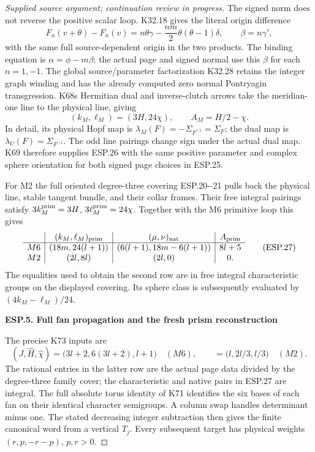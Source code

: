 \begin{proof}[Supplied source argument; continuation review in progress]
The signed norm does not reverse the positive scalar loop. K32.18
gives the literal origin difference
\[
 F_n(v+\theta)-F_n(v)
       =n\theta\gamma-\frac{nm}{2}\theta(\theta-1)\delta,
 \qquad \beta=n\gamma',
 \tag{ESP.25}
\]
with the same full source-dependent origin in the two products.
The binding equation is \(\alpha=\phi-m\beta\); the actual page
and signed normal use this \(\beta\) for each \(n=1,-1\).
The global source/parameter factorization K32.28 retains the integer
graph winding and has the already computed zero normal Pontryagin
transgression. K68\textquotesingle s Hermitian dual and inverse-clutch arrows take
the meridian-one line to the physical line, giving
\[
 (k_M,\ell_M)=(3H,24\chi),\qquad
                   A_M=H/2-\chi.
 \tag{ESP.26}
\]
In detail, its physical Hopf map is
\(\lambda_M(F)=-\Sigma_{F^{-1}}=\Sigma_F\); the dual map is
\(\lambda_U(F)=\Sigma_{F^{-1}}\). The odd line pairings change
sign under the actual dual map. K69 therefore supplies ESP.26 with
the same positive parameter and complex sphere orientation for both
signed page choices in ESP.25.

For M2 the full oriented degree-three covering ESP.20-\/-21 pulls back
the physical line, stable tangent bundle, and their collar frames.
Their free integral pairings satisfy
\(3k_M^{\rm prim}=3H\), \(3\ell_M^{\rm prim}=24\chi\).
Together with the M6 primitive loop this gives
\[
 \begin{array}{c|c|c|c}
 &(k_M,\ell_M)_{\rm prim}&(\mu,\nu)_{\rm nat}&A_{\rm prim}\\\hline
 M6&(18m,24(l+1))&(6(l+1),18m-6(l+1))&8l+5\\
 M2&(2l,8l)&(2l,0)&0.
 \end{array}
 \tag{ESP.27}
\]
The equalities used to obtain the second row are in free integral
characteristic groups on the displayed covering. Its sphere class
is subsequently evaluated by \((4k_M-\ell_M)/24\).

\par

\medskip\noindent\textbf{ESP.5. Full fan propagation and the fresh prism reconstruction}

\par\nobreak

The precise K73 inputs are
\[
 (J,\widehat H,\widehat\chi)
 =\bigl(3l+2,6(3l+2),l+1\bigr)\quad(M6),
 \qquad
 =\bigl(l,2l/3,l/3\bigr)\quad(M2).
 \tag{ESP.28}
\]
The rational entries in the latter row are the actual page data
divided by the degree-three family cover; the characteristic and
native pairs in ESP.27 are integral. The full absolute torus
identity of K71 identifies the six bases of each fan on their
identical character semigroups. A column swap handles determinant
minus one. The stated decreasing integer subtraction then gives
the finite canonical word from a vertical \(T_j\). Every subsequent
target has physical weights \((r,p,-r-p)\), \(p,r>0\).


\end{proof}
